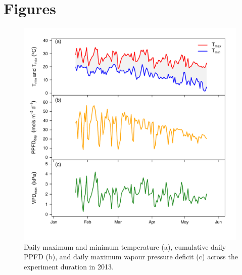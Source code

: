 \documentclass[a4paper]{article}\usepackage[]{graphicx}\usepackage[]{color}
\begin{document}
\clearpage
\section*{Figures}

\begin{figure}[h!]
    \centering
    \includegraphics[width=0.99\textwidth]{airvars.pdf}
    \caption{Daily maximum and minimum temperature (a), cumulative daily PPFD (b), and daily maximum vapour pressure deficit (c) across the experiment duration in 2013.}
    \label{fig:figure1}
\end{figure}
\end{document}
